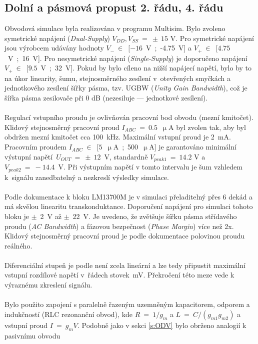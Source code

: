 \subsection{Dolní a pásmová propust 2. řádu, 4. řádu}\label{s:DP2}
\noindent Obvodová simulace byla realizována v programu Multisim. Bylo zvoleno symetrické napájení (\textit{Dual-Supply}) $V_{DD},V_{SS}~=~\pm~15$ V. Pro symetrické napájení jsou výrobcem udávány hodnoty $V_{-}~\in$~$[-16$~V~;~-4.75~V] a $V_{+}~\in$~$[4.75$~V~;~16~V]. Pro nesymetrické napájení (\textit{Single-Supply}) je doporučeno napájení $V_{+}~\in$~$[9.5$~V~;~32~V]. Pokud by bylo cíleno na nižší napájecí napětí, bylo by to na úkor linearity, šumu, stejnosměrného zesílení v~otevřených smyčkách a jednotkového zesílení šířky pásma, tzv. UGBW (\textit{Unity Gain Bandwidth}), což je šířka pásma zesilovače při 0 dB (nezesiluje --- jednotkové zesílení).\\
\\
Regulací vstupního proudu je ovlivňován pracovní bod obvodu (mezní kmitočet). Klidový stejnosměrný pracovní proud $I_{ABC}~=~0.5$~$\upmu$A byl zvolen tak, aby byl obdržen mezní kmitočet cca 100~kHz. Maximální vstupní proud je 2~mA. Pracovním proudem $I_{ABC}~\in$~$[5$~$\upmu$A~;~500~$\upmu$A] je garantováno minimální výstupní napětí~$U_{OUT}~=~\pm~12$~V, standardně $V_{peak 1}~=~14.2$ V a $V_{peak 2}~=~-14.4$~V. Při výstupním napětí v tomto intervalu je šum vzhledem k~signálu zanedbatelný a nezkreslí výsledky simulace.\\
\\
\noindent Podle dokumentace k bloku LM13700M je v simulaci přeladitelný přes 6 dekád a má skvělou linearitu transkonduktance. Doporučení napájení pro simulaci tohoto bloku je $\pm$~2~V až $\pm$~22~V. Je uvedeno, že zvětšuje šířku pásma střídavého proudu (\textit{AC Bandwidth}) a fázovou bezpečnost (\textit{Phase Margin}) více než 2x. Klidový stejnosměrný pracovní proud je podle dokumentace polovinou proudu reálného.\\
\\
\noindent Diferenciální stupeň je podle není zcela lineární a lze tedy připustit maximální vstupní rozdílové napětí v~řádech stovek~mV. Překročení této meze vede k výraznému zkreslení signálu.\\
\\
\noindent Bylo použito zapojení s paralelně řazeným uzemněným kapacitorem, odporem a indukčností (RLC rezonanční obvod), kde $R~=~1/g_m$ a $L~=~C/(g_{m1}g_{m2})$ a vstupní proud $I~=~g_mV$. Podobně jako v sekci \ref{s:ODV} bylo obrženo analogií k pasivnímu obvodu
